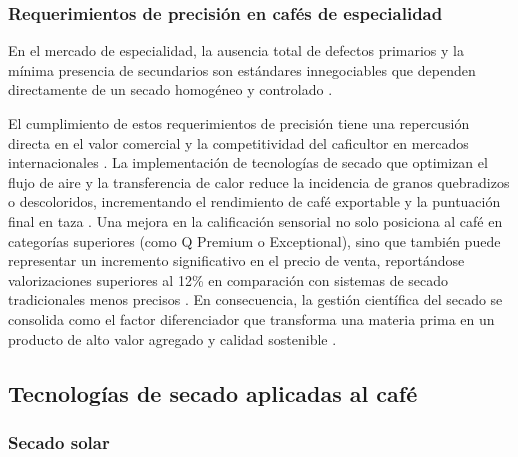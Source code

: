 \subsubsection{Requerimientos de precisión en cafés de especialidad}

 En el mercado de especialidad, la ausencia total de defectos primarios y la mínima presencia de secundarios son estándares innegociables que dependen directamente de un secado homogéneo y controlado \parencite{escuela_superior_politecnica_agropecuaria_de_manabi_manuel_felix_lopez_carrera_de_ingenieria_agricola_postharvest_2023, freitas_santos_efect_2020, huaman-murillo_physical_2024, largo-avila_influence_2023}.

El cumplimiento de estos requerimientos de precisión tiene una repercusión directa en el valor comercial y la competitividad del caficultor en mercados internacionales \parencite{barbosa_sensory_2019, carmo_quality_2020, freitas_santos_efect_2020}. La implementación de tecnologías de secado que optimizan el flujo de aire y la transferencia de calor reduce la incidencia de granos quebradizos o descoloridos, incrementando el rendimiento de café exportable y la puntuación final en taza \parencite{abreu_influence_2025, konopatzki_coffee_2022, konopatzki_price_2019}. Una mejora en la calificación sensorial no solo posiciona al café en categorías superiores (como Q Premium o Exceptional), sino que también puede representar un incremento significativo en el precio de venta, reportándose valorizaciones superiores al 12\% en comparación con sistemas de secado tradicionales menos precisos \parencite{firdissa_coffee_2022, abreu_influence_2025, huaman-murillo_physical_2024, konopatzki_price_2019}. En consecuencia, la gestión científica del secado se consolida como el factor diferenciador que transforma una materia prima en un producto de alto valor agregado y calidad sostenible \parencite{carmo_quality_2020, freitas_santos_efect_2020, largo-avila_influence_2023}.

\subsection{Tecnologías de secado aplicadas al café}

\subsubsection{Secado solar}

